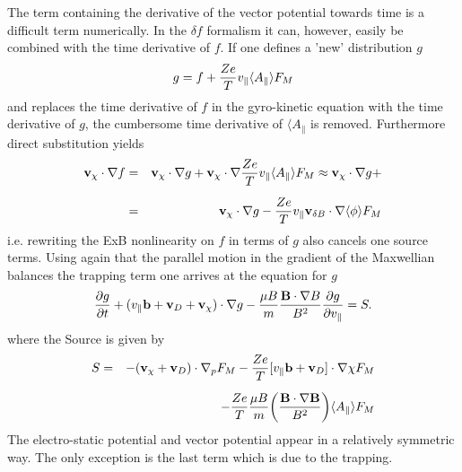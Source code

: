 \documentclass{report}
\def\be{\begin{equation}}
\def\ee{\end{equation}}
\def\bee{\begin{eqnarray}}
\def\eee{\end{eqnarray}}
\begin{document}
The term containing the derivative of the vector potential towards time is a difficult term numerically. In the $\delta f$ 
formalism it can, however, easily be combined with the time derivative of $f$. If one defines a 'new' distribution $g$ 
\be 
g = f + {Z e \over T} v_\parallel \langle A_\parallel \rangle F_M 
\ee
and replaces the time derivative of $f$ in the gyro-kinetic equation with the time derivative of $g$, the cumbersome 
time derivative of $\langle A_\parallel$ is removed. 
Furthermore direct substitution yields 
\bee 
{\bf v}_\chi \cdot \nabla f &=& {\bf v}_\chi \cdot \nabla g + {\bf v}_\chi \cdot \nabla {Z e \over T} v_\parallel 
\langle A_\parallel \rangle F_M \approx  {\bf v}_\chi \cdot \nabla g + %
\cr
\noalign{\vskip 0.2 truecm} 
& = & {\bf v}_\chi \cdot \nabla g
- {Z e \over T} v_\parallel {\bf v}_{\delta B} \cdot \nabla \langle \phi \rangle F_M 
\eee
i.e. rewriting the ExB nonlinearity on $f$ in terms of $g$ also cancels one source terms. Using again that the parallel 
motion in the gradient of the Maxwellian balances the trapping term one arrives at the equation for $g$
\be
\label{g-vlasov} 
\index{gyrokinetic Vlasov equation}
{\partial g \over \partial t} + (v_\parallel {\bf b} + {\bf v}_D + {\bf v}_\chi) \cdot \nabla g  
-{\mu B \over m}{{\bf B}\cdot \nabla B \over B^2}{\partial g \over \partial v_\parallel} = S. 
\ee
where the Source is given by 
\bee 
\label{sources}
S &=&  - ({\bf v}_\chi + {\bf v}_D) \cdot \nabla_p F_M
-  {Ze \over T} [ v_\parallel {\bf b} + {\bf v}_D ] \cdot \nabla \chi F_M \cr 
\noalign{\vskip 0.2 truecm} 
& & - {Z e \over T} {\mu B \over m} \biggl ( {{\bf B} \cdot \nabla {\bf B} \over B^2} 
\biggr ) \langle A_\parallel \rangle F_M 
\eee
The electro-static potential and vector potential appear in a relatively symmetric way. The only 
exception is the last term which is due to the trapping. 
\end{document}
